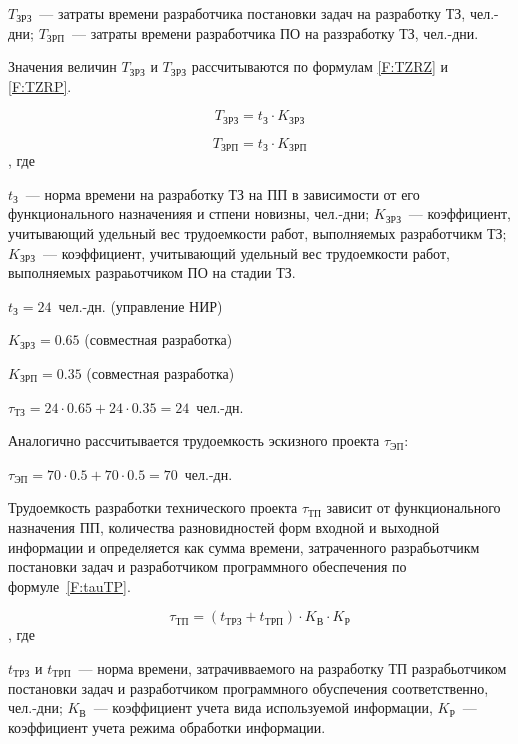$T_{\text{ЗРЗ}}$~--- затраты времени разработчика постановки задач на разработку ТЗ, чел.-дни; $T_{\text{ЗРП}}$~--- затраты времени разработчика ПО на раззработку ТЗ, чел.-дни.

Значения величин $T_{\text{ЗРЗ}}$ и $T_{\text{ЗРЗ}}$ рассчитываются по формулам \ref{F:TZRZ} и \ref{F:TZRP}.

\begin{equation}
T_{\text{ЗРЗ}} = t_{\text{З}} \cdot K_{\text{ЗРЗ}}
\label{F:TZRZ}
\end{equation}

\begin{equation}
T_{\text{ЗРП}} = t_{\text{З}} \cdot K_{\text{ЗРП}}
\label{F:TZRP}
\end{equation}, где

$t_{\text{З}}$~--- норма времени на разработку ТЗ на ПП в зависимости от его функционального назначенияя и стпени новизны, чел.-дни; $K_{\text{ЗРЗ}}$~--- коэффициент, учитывающий удельный вес трудоемкости работ, выполняемых разработчикм ТЗ; $K_{\text{ЗРЗ}}$~--- коэффициент, учитывающий удельный вес трудоемкости работ, выполняемых разраьотчиком ПО на стадии ТЗ.

$t_{\text{З}} = 24$~чел.-дн. (управление НИР)

$K_{\text{ЗРЗ}} = 0.65$ (совместная разработка)

$K_{\text{ЗРП}} = 0.35$ (совместная разработка)

$\tau_{\text{ТЗ}} = 24 \cdot 0.65 + 24 \cdot 0.35 = 24$~чел.-дн.

Аналогично рассчитывается трудоемкость эскизного проекта $\tau_{\text{ЭП}}$:

$\tau_{\text{ЭП}} = 70 \cdot 0.5 + 70 \cdot 0.5 = 70$~чел.-дн.

Трудоемкость разработки технического проекта $\tau_{\text{ТП}}$ зависит от функционального назначения ПП, количества разновидностей форм входной и выходной информации и определяется как сумма времени, затраченного разрабьотчикм постановки задач и разработчиком программного обеспечения по формуле~\ref{F:tauTP}.

\begin{equation}
\tau_{\text{ТП}} = (t_{\text{ТРЗ}} + t_{\text{ТРП}}) \cdot K_{\text{В}} \cdot K_{\text{Р}}
\label{F:tauTP}
\end{equation}, где

$t_{\text{ТРЗ}}$ и $t_{\text{ТРП}}$~--- норма времени, затрачивваемого на разработку ТП разрабьотчиком постановки задач и разработчиком программного обуспечения соответственно, чел.-дни; $K_{\text{В}}$~--- коэффициент учета вида используемой информации, $K_{\text{Р}}$~--- коэффициент учета режима обработки информации.

